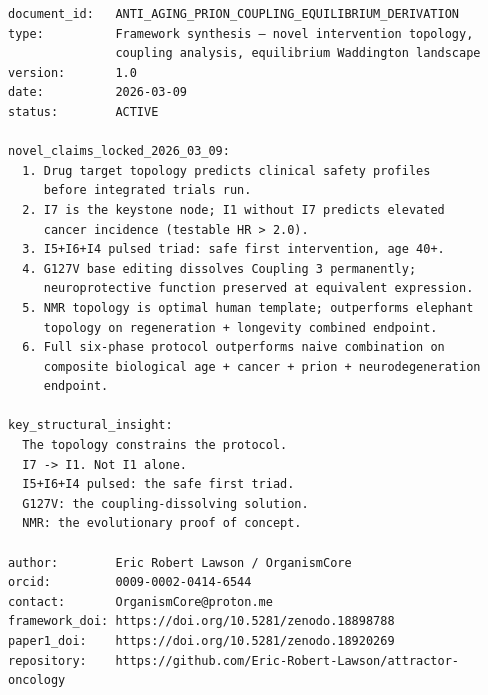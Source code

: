 \documentclass[12pt,a4paper]{article}
\begin{document}
\begin{small}
\begin{verbatim}
document_id:   ANTI_AGING_PRION_COUPLING_EQUILIBRIUM_DERIVATION
type:          Framework synthesis — novel intervention topology,
               coupling analysis, equilibrium Waddington landscape
version:       1.0
date:          2026-03-09
status:        ACTIVE

novel_claims_locked_2026_03_09:
  1. Drug target topology predicts clinical safety profiles
     before integrated trials run.
  2. I7 is the keystone node; I1 without I7 predicts elevated
     cancer incidence (testable HR > 2.0).
  3. I5+I6+I4 pulsed triad: safe first intervention, age 40+.
  4. G127V base editing dissolves Coupling 3 permanently;
     neuroprotective function preserved at equivalent expression.
  5. NMR topology is optimal human template; outperforms elephant
     topology on regeneration + longevity combined endpoint.
  6. Full six-phase protocol outperforms naive combination on
     composite biological age + cancer + prion + neurodegeneration
     endpoint.

key_structural_insight:
  The topology constrains the protocol.
  I7 -> I1. Not I1 alone.
  I5+I6+I4 pulsed: the safe first triad.
  G127V: the coupling-dissolving solution.
  NMR: the evolutionary proof of concept.

author:        Eric Robert Lawson / OrganismCore
orcid:         0009-0002-0414-6544
contact:       OrganismCore@proton.me
framework_doi: https://doi.org/10.5281/zenodo.18898788
paper1_doi:    https://doi.org/10.5281/zenodo.18920269
repository:    https://github.com/Eric-Robert-Lawson/attractor-oncology
\end{verbatim}
\end{small}
\end{document}
